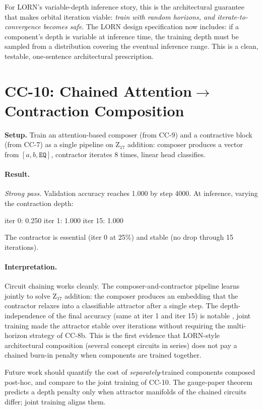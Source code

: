 \documentclass[10pt, twocolumn, a4paper]{article}
\begin{document}
For LORN's variable-depth inference story, this is the architectural guarantee that makes orbital iteration viable: \emph{train with random horizons, and iterate-to-convergence becomes safe}. The LORN design specification now includes: if a component's depth is variable at inference time, the training depth must be sampled from a distribution covering the eventual inference range. This is a clean, testable, one-sentence architectural prescription.

\section{CC-10: Chained Attention$\to$Contraction Composition}

\textbf{Setup.} Train an attention-based composer (from CC-9) and a contractive block (from CC-7) as a single pipeline on Z$_{17}$ addition: composer produces a vector from $[a, b, \mathtt{EQ}]$, contractor iterates 8 times, linear head classifies.

\paragraph{Result.} \emph{Strong pass.} Validation accuracy reaches 1.000 by step 4000. At inference, varying the contraction depth:
\begin{center}\small
iter 0: 0.250 \quad iter 1: 1.000 \quad iter 15: 1.000
\end{center}
The contractor is essential (iter 0 at 25\%) and stable (no drop through 15 iterations).

\paragraph{Interpretation.} Circuit chaining works cleanly. The composer-and-contractor pipeline learns jointly to solve Z$_{17}$ addition: the composer produces an embedding that the contractor relaxes into a classifiable attractor after a single step. The depth-independence of the final accuracy (same at iter 1 and iter 15) is notable ,  joint training made the attractor stable over iterations without requiring the multi-horizon strategy of CC-8b. This is the first evidence that LORN-style architectural composition (several concept circuits in series) does not pay a chained burn-in penalty when components are trained together.

Future work should quantify the cost of \emph{separately}-trained components composed post-hoc, and compare to the joint training of CC-10. The gauge-paper theorem predicts a depth penalty only when attractor manifolds of the chained circuits differ; joint training aligns them.
\end{document}

